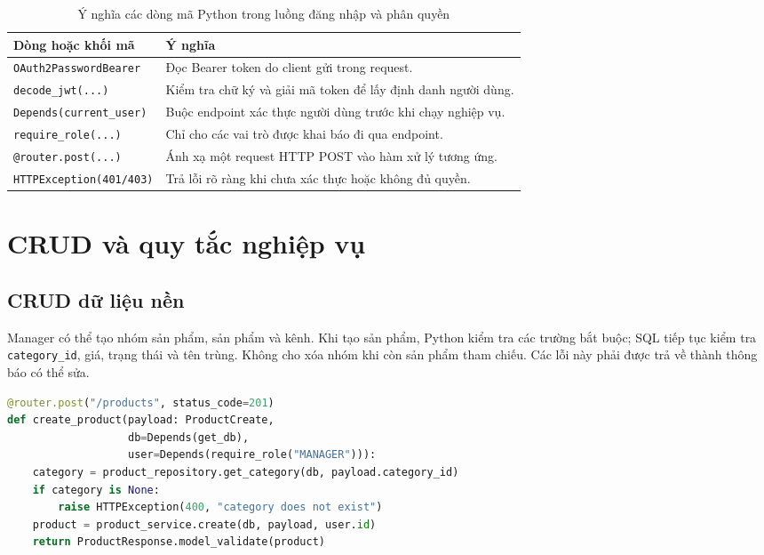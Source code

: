 \begin{table}[h!]
\centering
\small
\caption{Ý nghĩa các dòng mã Python trong luồng đăng nhập và phân quyền}
\begin{tabularx}{\textwidth}{|L{4.0cm}|Y|}
\hline
\textbf{Dòng hoặc khối mã} & \textbf{Ý nghĩa}\\\hline
\texttt{OAuth2PasswordBearer} & Đọc Bearer token do client gửi trong request.\\\hline
\texttt{decode\_jwt(...)} & Kiểm tra chữ ký và giải mã token để lấy định danh người dùng.\\\hline
\texttt{Depends(current\_user)} & Buộc endpoint xác thực người dùng trước khi chạy nghiệp vụ.\\\hline
\texttt{require\_role(...)} & Chỉ cho các vai trò được khai báo đi qua endpoint.\\\hline
\texttt{@router.post(...)} & Ánh xạ một request HTTP POST vào hàm xử lý tương ứng.\\\hline
\texttt{HTTPException(401/403)} & Trả lỗi rõ ràng khi chưa xác thực hoặc không đủ quyền.\\\hline
\end{tabularx}
\end{table}

\section{CRUD và quy tắc nghiệp vụ}

\subsection{CRUD dữ liệu nền}

Manager có thể tạo nhóm sản phẩm, sản phẩm và kênh. Khi tạo sản phẩm, Python kiểm tra các trường bắt buộc; SQL tiếp tục kiểm tra \texttt{category\_id}, giá, trạng thái và tên trùng. Không cho xóa nhóm khi còn sản phẩm tham chiếu. Các lỗi này phải được trả về thành thông báo có thể sửa.

\begin{lstlisting}[language=Python,caption={Ví dụ endpoint tạo sản phẩm}]
@router.post("/products", status_code=201)
def create_product(payload: ProductCreate,
                   db=Depends(get_db),
                   user=Depends(require_role("MANAGER"))):
    category = product_repository.get_category(db, payload.category_id)
    if category is None:
        raise HTTPException(400, "category does not exist")
    product = product_service.create(db, payload, user.id)
    return ProductResponse.model_validate(product)
\end{lstlisting}

